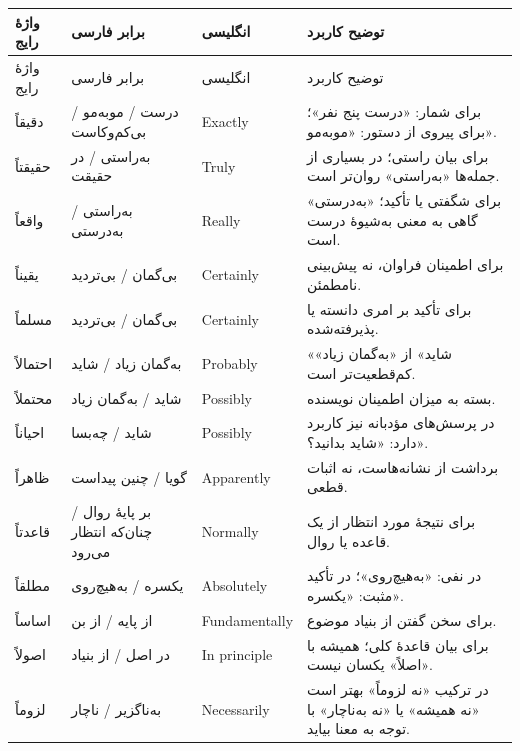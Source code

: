 \begin{longtable}{|p{2.5cm}|p{4.0cm}|p{2.3cm}|p{5.3cm}|}
\hline
واژهٔ رایج & برابر فارسی & انگلیسی & توضیح کاربرد \\
\hline
\endfirsthead
\hline
واژهٔ رایج & برابر فارسی & انگلیسی & توضیح کاربرد \\
\hline
\endhead

دقیقاً & درست / مو‌به‌مو / بی‌کم‌وکاست & \textenglish{Exactly} & برای شمار: «درست پنج نفر»؛ برای پیروی از دستور: «مو‌به‌مو». \\
\hline
حقیقتاً & به‌راستی / در حقیقت & \textenglish{Truly} & برای بیان راستی؛ در بسیاری از جمله‌ها «به‌راستی» روان‌تر است. \\
\hline
واقعاً & به‌راستی / به‌درستی & \textenglish{Really} & برای شگفتی یا تأکید؛ «به‌درستی» گاهی به معنی به‌شیوهٔ درست است. \\
\hline
یقیناً & بی‌گمان / بی‌تردید & \textenglish{Certainly} & برای اطمینان فراوان، نه پیش‌بینی نامطمئن. \\
\hline
مسلماً & بی‌گمان / بی‌تردید & \textenglish{Certainly} & برای تأکید بر امری دانسته یا پذیرفته‌شده. \\
\hline
احتمالاً & به‌گمان زیاد / شاید & \textenglish{Probably} & «شاید» از «به‌گمان زیاد» کم‌قطعیت‌تر است. \\
\hline
محتملاً & شاید / به‌گمان زیاد & \textenglish{Possibly} & بسته به میزان اطمینان نویسنده. \\
\hline
احیاناً & شاید / چه‌بسا & \textenglish{Possibly} & در پرسش‌های مؤدبانه نیز کاربرد دارد: «شاید بدانید؟». \\
\hline
ظاهراً & گویا / چنین پیداست & \textenglish{Apparently} & برداشت از نشانه‌هاست، نه اثبات قطعی. \\
\hline
قاعدتاً & بر پایهٔ روال / چنان‌که انتظار می‌رود & \textenglish{Normally} & برای نتیجهٔ مورد انتظار از یک قاعده یا روال. \\
\hline
مطلقاً & یکسره / به‌هیچ‌روی & \textenglish{Absolutely} & در نفی: «به‌هیچ‌روی»؛ در تأکید مثبت: «یکسره». \\
\hline
اساساً & از پایه / از بن & \textenglish{Fundamentally} & برای سخن گفتن از بنیاد موضوع. \\
\hline
اصولاً & در اصل / از بنیاد & \textenglish{In principle} & برای بیان قاعدهٔ کلی؛ همیشه با «اصلاً» یکسان نیست. \\
\hline
لزوماً & به‌ناگزیر / ناچار & \textenglish{Necessarily} & در ترکیب «نه لزوماً» بهتر است «نه همیشه» یا «نه به‌ناچار» با توجه به معنا بیاید. \\
\hline
\end{longtable}
\endgroup


